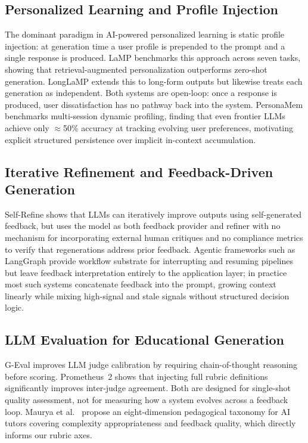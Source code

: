 \documentclass[conference]{IEEEtran}
\begin{document}
\subsection{Personalized Learning and Profile Injection}

The dominant paradigm in AI-powered personalized learning is static profile injection: at generation time a user profile is prepended to the prompt and a single response is produced. LaMP \cite{b3} benchmarks this approach across seven tasks, showing that retrieval-augmented personalization outperforms zero-shot generation. LongLaMP \cite{b8} extends this to long-form outputs but likewise treats each generation as independent. Both systems are open-loop: once a response is produced, user dissatisfaction has no pathway back into the system. PersonaMem \cite{b10} benchmarks multi-session dynamic profiling, finding that even frontier LLMs achieve only $\approx$50\% accuracy at tracking evolving user preferences, motivating explicit structured persistence over implicit in-context accumulation.

\subsection{Iterative Refinement and Feedback-Driven Generation}

Self-Refine \cite{b12} shows that LLMs can iteratively improve outputs using self-generated feedback, but uses the model as both feedback provider and refiner with no mechanism for incorporating external human critiques and no compliance metrics to verify that regenerations address prior feedback. Agentic frameworks such as LangGraph \cite{b9} provide workflow substrate for interrupting and resuming pipelines but leave feedback interpretation entirely to the application layer; in practice most such systems concatenate feedback into the prompt, growing context linearly while mixing high-signal and stale signals without structured decision logic.

\subsection{LLM Evaluation for Educational Generation}

G-Eval \cite{b4} improves LLM judge calibration by requiring chain-of-thought reasoning before scoring. Prometheus~2 \cite{b5} shows that injecting full rubric definitions significantly improves inter-judge agreement. Both are designed for single-shot quality assessment, not for measuring how a system evolves across a feedback loop. Maurya et al.\ \cite{b13} propose an eight-dimension pedagogical taxonomy for AI tutors covering complexity appropriateness and feedback quality, which directly informs our rubric axes.
\end{document}
